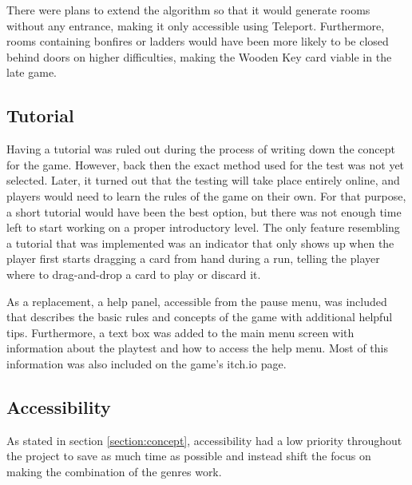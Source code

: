 There were plans to extend the algorithm so that it would generate rooms without any entrance, making it only accessible using Teleport. Furthermore, rooms containing bonfires or ladders would have been more likely to be closed behind doors on higher difficulties, making the Wooden Key card viable in the late game.



\subsection{Tutorial}

Having a tutorial was ruled out during the process of writing down the concept for the game. However, back then the exact method used for the test was not yet selected. Later, it turned out that the testing will take place entirely online, and players would need to learn the rules of the game on their own. For that purpose, a short tutorial would have been the best option, but there was not enough time left to start working on a proper introductory level. The only feature resembling a tutorial that was implemented was an indicator that only shows up when the player first starts dragging a card from hand during a run, telling the player where to drag-and-drop a card to play or discard it.

As a replacement, a help panel, accessible from the pause menu, was included that describes the basic rules and concepts of the game with additional helpful tips. Furthermore, a text box was added to the main menu screen with information about the playtest and how to access the help menu. Most of this information was also included on the game's itch.io page.



\subsection{Accessibility}

As stated in section \ref{section:concept}, accessibility had a low priority throughout the project to save as much time as possible and instead shift the focus on making the combination of the genres work.